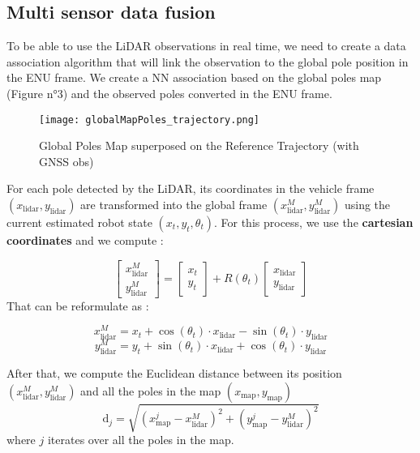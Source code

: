 \documentclass[conference]{IEEEtran}
\begin{document}
\subsection{Multi sensor data fusion}

To be able to use the LiDAR observations in real time, we need to create a data association algorithm that will link the observation to the global pole position in the ENU frame. We create a NN association based on the global poles map (Figure n°3) and the observed poles converted in the ENU frame.   

\begin{figure}[H]
    \centering
    \texttt{[image: globalMapPoles\_trajectory.png]}
    \caption{Global Poles Map superposed on the Reference Trajectory (with GNSS obs)}
    \label{fig:enter-label}
\end{figure}

For each pole detected by the LiDAR, its coordinates in the vehicle frame \((x_{\text{lidar}}, y_{\text{lidar}})\) are transformed into the global frame \((x_{\text{lidar}}^{M}, y_{\text{lidar}}^{M})\) using the current estimated robot state \((x_t, y_t, \theta_t)\). For this process, we use the \textbf{cartesian coordinates} and we compute :

\[
\begin{bmatrix}
x_{\text{lidar}}^{M} \\
y_{\text{lidar}}^{M}
\end{bmatrix}
=
\begin{bmatrix}
x_t \\
y_t
\end{bmatrix} 
+
R(\theta_t)
\begin{bmatrix}
x_{\text{lidar}} \\
y_{\text{lidar}}
\end{bmatrix}
\]
\noindent That can be reformulate as :

\[
x_{\text{lidar}}^{M} = x_t + \cos(\theta_t) \cdot x_{\text{lidar}} - \sin(\theta_t) \cdot y_{\text{lidar}}
\]
\[
y_{\text{lidar}}^{M} = y_t + \sin(\theta_t) \cdot x_{\text{lidar}} + \cos(\theta_t) \cdot y_{\text{lidar}}
\]

\noindent After that, we compute the Euclidean distance between its position \((x_{\text{lidar}}^{M}, y_{\text{lidar}}^{M})\) and all the poles in the map \((x_{\text{map}}, y_{\text{map}})\)
\[
\text{d}_{j} = \sqrt{(x_{\text{map}}^j - x_{\text{lidar}}^{M})^2 + (y_{\text{map}}^j - y_{\text{lidar}}^{M})^2}
\]
where \(j\) iterates over all the poles in the map.
\end{document}

